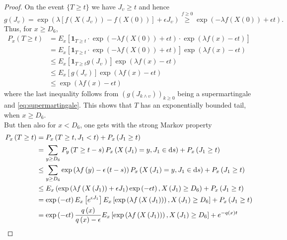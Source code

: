 \documentclass[12pt,a4paper]{scrartcl}
\numberwithin{equation}{section}
\begin{document}
\begin{proof}
On the event $\lbrace T \geq t \rbrace$ we have $ J_{\upsilon} \geq t $ and hence
$$ g\left( J_{\upsilon} \right) = \exp\left( \lambda \left[f\left(X\left(J_{\upsilon} \right) \right) - f\left(X\left(0\right) \right) \right] + \epsilon J_{\upsilon}\right) \overset{f \geq 0}{\geq} \exp\left(-\lambda f\left(X\left(0\right) \right)  + \epsilon t \right).$$
Thus, for $x \geq D_6$,
\begin{align*}
P_x\left(T \geq t \right) &= E_x\left[\textbf{1}_{T \geq t} \cdot \exp\left(-\lambda f\left(X\left(0\right) \right) + \epsilon t \right) \cdot \exp\left(\lambda f\left(x\right) - \epsilon t \right) \right] \\
&= E_x\left[\textbf{1}_{T \geq t} \cdot \exp\left(-\lambda f\left(X\left(0\right) \right) + \epsilon t \right) \right] \exp\left(\lambda f\left(x\right) - \epsilon t \right) \\
&\leq E_x\left[\textbf{1}_{T \geq t}  g\left(J_{\upsilon} \right) \right] \exp\left(\lambda f\left(x\right) - \epsilon t \right) \\
&\leq E_x\left[g\left(J_{\upsilon} \right) \right] \exp\left(\lambda f\left(x\right) - \epsilon t \right) \\
&\leq \exp\left(\lambda f\left(x\right) - \epsilon t \right)
\end{align*}
where the last inequality follows from $\left(g\left(J_{k \wedge \upsilon} \right)\right)_{ k \geq 0}$ being a supermartingale and 
\eqref{eq:supermartingale}. This shows that $T$ has an exponentially bounded tail, when $x \geq D_6.$ \\[2ex]
But then also for $x < D_6$, one gets with the strong Markov property
\begin{align*}
P_x\left(T \geq t \right) &= P_x\left(T \geq t, J_1 < t \right) + P_x\left(J_1 \geq t \right) \\
&= \sum_{y \geq D_6} P_y\left(T \geq t - s \right) P_x\left(X\left(J_1 \right) = y , J_1 \in \textnormal{d}s \right) + P_x\left(J_1 \geq t \right)\\
&\leq \sum_{y \geq D_6 } \exp\left( \lambda f\left(y\right) - \epsilon \left(t-s\right) \right) P_x\left(X\left(J_1 \right) = y , J_1 \in \textnormal{d}s \right) + P_x\left(J_1 \geq t \right)\\
&\leq E_x\left(\exp\left(\lambda f\left(X\left(J_1\right) \right) + \epsilon J_1 \right) \exp\left(-\epsilon t \right), X\left(J_1\right) \geq D_6 \right) + P_x\left(J_1 \geq t \right) \\
&=\exp\left(-\epsilon t \right) E_x\left[e^{\epsilon J_1} \right] E_x\left[\exp\left(\lambda f\left(X\left(J_1\right) \right)\right) , X\left(J_1\right) \geq D_6  \right]  + P_x\left(J_1 \geq t \right) \\
&= \exp\left(-\epsilon t \right) \frac{q\left(x\right)}{q\left(x\right) - \epsilon} E_x\left[\exp\left(\lambda f\left(X\left(J_1\right) \right)\right) , X\left(J_1\right) \geq D_6  \right] + e^{-q\left(x\right) t}\\
\end{align*}


\end{proof}
\end{document}
